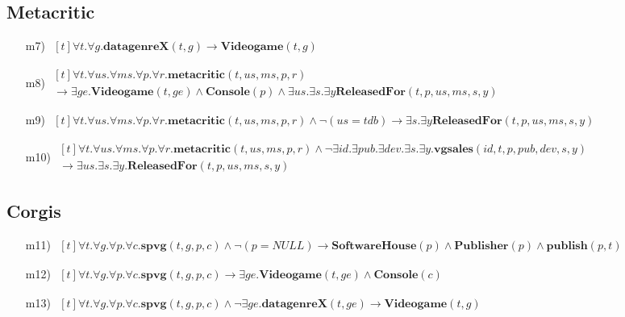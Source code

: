 \subsection*{Metacritic}
\begin{itemize}
	\item[m7)]
	$ \begin{aligned}[t]
	\forall t. \forall g.\textbf{datagenreX}(t,g) \rightarrow \textbf{Videogame}(t,g)
	\end{aligned} $
	\item[m8)]
	$ \begin{aligned}[t]
	\forall t. \forall us. \forall ms. \forall p. \forall r.\textbf{metacritic}(t,us,ms,p,r) \hspace{200pt} \\
	\rightarrow \exists ge. \textbf{Videogame}(t,ge) \wedge \textbf{Console}(p) \wedge \exists us. \exists s. \exists y \textbf{ReleasedFor}(t,p,us,ms, s,y)
	\end{aligned} $
	\item[m9)]
	$ \begin{aligned}[t]
	\forall t. \forall us. \forall ms. \forall p. \forall r.\textbf{metacritic}(t,us,ms,p,r) \wedge \neg (us = tdb) \rightarrow \exists s. \exists y \textbf{ReleasedFor}(t,p,us,ms, s,y)
	\end{aligned} $
	\item[m10)]
	$ \begin{aligned}[t]
	\forall t. \forall us. \forall ms. \forall p. \forall r.\textbf{metacritic}(t,us,ms,p,r) \wedge
	\neg \exists id. \exists pub. \exists dev. \exists s. \exists y.\textbf{vgsales}(id,t,p,pub,dev,s,y) \\
	\rightarrow \exists us. \exists s. \exists y. \textbf{ReleasedFor}(t,p,us,ms, s,y) \hspace{240pt}
	\end{aligned} $
\end{itemize}

\subsection*{Corgis}
\begin{itemize}
	\item[m11)]
	$ \begin{aligned}[t]
		\forall t. \forall g. \forall p. \forall c.\textbf{spvg}(t,g,p,c) \wedge \neg (p = NULL) \rightarrow \textbf{SoftwareHouse}(p) \wedge \textbf{Publisher}(p) \wedge \textbf{publish}(p,t)
	\end{aligned} $
	\item[m12)]
	$ \begin{aligned}[t]
		\forall t. \forall g. \forall p. \forall c. \textbf{spvg}(t,g,p,c) \rightarrow \exists ge. \textbf{Videogame}(t,ge) \wedge \textbf{Console}(c)
	\end{aligned} $
	\item[m13)]
	$ \begin{aligned}[t]
	\forall t. \forall g. \forall p. \forall c. \textbf{spvg}(t,g,p,c) \wedge \neg \exists ge.\textbf{datagenreX}(t,ge)
	\rightarrow \textbf{Videogame}(t,g)
	\end{aligned} $
\end{itemize}

